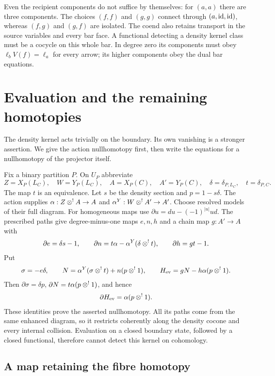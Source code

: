 Even the recipient components do not suffice by
themselves: for $(a,a)$ there are three components.
The choices $(f,f)$ and $(g,g)$ connect through
$(a,\mathrm{id},\mathrm{id})$, whereas $(f,g)$ and $(g,f)$ are
isolated. The coend also retains transport in the
source variables and every bar face. A functional
detecting a density kernel class must be a cocycle
on this whole bar. In degree zero its components
must obey $\ell_bV(f)=\ell_a$ for every arrow;
its higher components obey the dual bar equations.

\section{Evaluation and the remaining homotopies}
\label{sec:vol2-density-homotopies}

The density kernel acts trivially on the boundary.
Its own vanishing is a stronger assertion. We give
the action nullhomotopy first, then write the equations
for a nullhomotopy of the projector itself.

Fix a binary partition $P$. On $U_P$ abbreviate
\[
 Z=X_P(L_C),\quad W=Y_P(L_C),\quad
 A=X_P(C),\quad A'=Y_P(C),\quad
 \delta=\delta_{P,L_C},\quad t=\delta_{P,C}.
\]
The map $t$ is an equivalence. Let $s$ be the density
section and $p=1-s\delta$. The action supplies
$\alpha:Z\mathbin{\otimes^!} A\to A$ and
$\alpha^Y:W\mathbin{\otimes^!} A'\to A'$.
Choose resolved models of their full diagram. For
homogeneous maps use $\partial u=du-(-1)^{|u|}ud$.
The prescribed paths give degree-minus-one maps
$e,n,h$ and a chain map $g:A'\to A$ with
\[
 \partial e=\delta s-1,\qquad
 \partial n=t\alpha-\alpha^Y(\delta\mathbin{\otimes^!} t),\qquad
 \partial h=gt-1.
\]
Put
\begin{equation}\label{eq:vol2-density-evaluation-homotopy}
 \sigma=-e\delta,\qquad
 N=\alpha^Y(\sigma\mathbin{\otimes^!} t)+n(p\mathbin{\otimes^!}1),\qquad
 H_{\mathrm{ev}}=gN-h\alpha(p\mathbin{\otimes^!}1).
\end{equation}
Then $\partial\sigma=\delta p$,
$\partial N=t\alpha(p\mathbin{\otimes^!}1)$, and hence
\[
 \partial H_{\mathrm{ev}}=\alpha(p\mathbin{\otimes^!}1).
\]
These identities prove the asserted nullhomotopy.
All its paths come from the same enhanced diagram,
so it restricts coherently along the density cocone
and every internal collision. Evaluation on a closed
boundary state, followed by a closed functional,
therefore cannot detect this kernel on cohomology.

\subsection{A map retaining the fibre homotopy}

